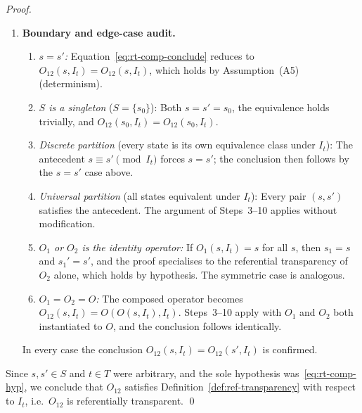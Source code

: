 \documentclass[12pt,openany]{book}
\newcommand{\calI}{\mathcal{I}}
\numberwithin{equation}{chapter}
\theoremstyle{plain}
\theoremstyle{definition}
\theoremstyle{remark}
\numberwithin{equation}{chapter}
\theoremstyle{plain}
\newcommand{\calS}{\mathcal{S}}
\newcommand{\calT}{\mathcal{T}}
\def\calI{I}%
\def\calS{S}%
\def\calT{T}%
\begin{document}
\begin{proof}
\begin{enumerate}
  \item \textbf{Boundary and edge-case audit.}
        \begin{enumerate}
          \item \emph{$s = s'$:}
                Equation~\eqref{eq:rt-comp-conclude} reduces to
                $O_{12}(s,\calI_t) = O_{12}(s,\calI_t)$, which holds
                by Assumption~(A5) (determinism).
          \item \emph{$\calS$ is a singleton} ($\calS = \{s_0\}$):
                Both $s = s' = s_0$, the equivalence holds trivially,
                and $O_{12}(s_0,\calI_t) = O_{12}(s_0,\calI_t)$.
          \item \emph{Discrete partition} (every state is its own
                equivalence class under $\calI_t$):
                The antecedent $s \equiv s' \pmod{\calI_t}$ forces
                $s = s'$; the conclusion then follows by the $s = s'$
                case above.
          \item \emph{Universal partition} (all states equivalent
                under $\calI_t$): Every pair $(s,s')$ satisfies
                the antecedent.  The argument of Steps~3--10
                applies without modification.
          \item \emph{$O_1$ or $O_2$ is the identity operator:}
                If $O_1(s,\calI_t) = s$ for all $s$, then
                $s_1 = s$ and $s_1' = s'$, and the proof specialises
                to the referential transparency of $O_2$ alone, which
                holds by hypothesis.  The symmetric case is analogous.
          \item \emph{$O_1 = O_2 = O$:}
                The composed operator becomes $O_{12}(s,\calI_t)
                = O(O(s,\calI_t),\calI_t)$.  Steps~3--10 apply
                with $O_1$ and $O_2$ both instantiated to $O$, and
                the conclusion follows identically.
        \end{enumerate}
        In every case the conclusion $O_{12}(s,\calI_t) =
        O_{12}(s',\calI_t)$ is confirmed.

\end{enumerate}

Since $s, s' \in \calS$ and $t \in \calT$ were arbitrary, and the sole
hypothesis was~\eqref{eq:rt-comp-hyp}, we conclude that $O_{12}$
satisfies Definition~\ref{def:ref-transparency} with respect to
$\calI_t$, i.e.\ $O_{12}$ is referentially transparent.
\qed
\end{proof}
\end{document}
